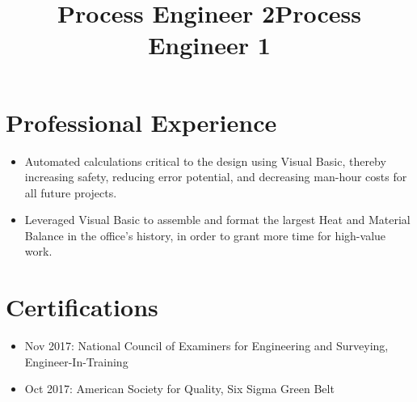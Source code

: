 \documentclass[12pt]{res} %
\begin{document}
\begin{resume}
\begin{multicols}{3}
          \end{multicols}
        \vspace{-24pt}

      \section{Professional Experience}
        \title{\textbf{Process Engineer 2}}
        \begin{position}
          \vspace{-14pt}
          \begin{itemize}[leftmargin=-0.4cm]
          \itemsep0em
          \item Automated calculations critical to the design using Visual Basic, thereby increasing safety, reducing error potential, and decreasing man-hour costs for all future projects.
          \end{itemize}
        \end{position}
        \vspace{-10pt}

        \title{\textbf{Process Engineer 1}}
        \begin{position}
          \vspace{-14pt}
          \begin{itemize}[leftmargin=-0.4cm]
              \itemsep0em
              \item Leveraged Visual Basic to assemble and format the largest Heat and Material Balance in the office's history, in order to grant more time for high-value work.
          \end{itemize}
        \end{position}
        \vspace{-12pt}

      \section{Certifications} 
        \begin{itemize}[leftmargin=-0.4cm]
        \itemsep0em
        \item Nov 2017: National Council of Examiners for Engineering and Surveying, Engineer-In-Training
        \item Oct 2017: American Society for Quality, Six Sigma Green Belt
        \end{itemize}
        \vspace{-12pt}

    \end{resume}

\vspace*{\fill}
\end{document}
